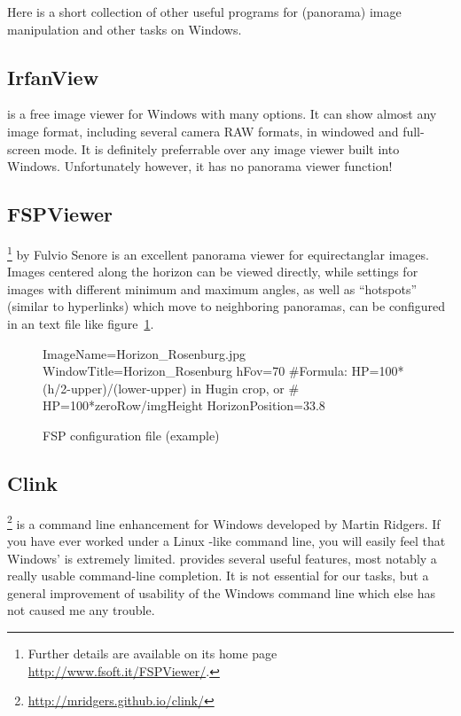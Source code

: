 Here is a short collection of other useful programs for (panorama)
image manipulation and other tasks on Windows.


\subsection{IrfanView}
\label{sec:landscapes:IrfanView}

 is a free image viewer for Windows with many
options. It can show almost any image format, including several camera
RAW formats, in windowed and full-screen mode. It is definitely
preferrable over any image viewer built into Windows. Unfortunately
however, it has no panorama viewer function!

\subsection{FSPViewer}
\label{sec:landscapes:FSPViewer}

\footnote{Further details are available on its home
  page \url{http://www.fsoft.it/FSPViewer/}.} by Fulvio
Senore is an excellent panorama viewer for equirectanglar
images. Images centered along the horizon can be viewed directly,
while settings for images with different minimum and maximum angles,
as well as ``hotspots'' (similar to hyperlinks) which move to
neighboring panoramas, can be configured in an  text file
like figure~\ref{fig:FSPexample}.


\begin{figure}[h]\centering
\begin{configfile}
ImageName=Horizon_Rosenburg.jpg
WindowTitle=Horizon_Rosenburg
hFov=70
#Formula: HP=100*(h/2-upper)/(lower-upper) in Hugin crop, or
#         HP=100*zeroRow/imgHeight
HorizonPosition=33.8
\end{configfile}
\caption{FSP configuration file (example)}
\label{fig:FSPexample}
\end{figure}

\subsection{Clink}
\label{sec:landscapes:clink}

\footnote{\url{http://mridgers.github.io/clink/}} is a command
line enhancement for Windows developed by Martin Ridgers. If you have
ever worked under a Linux -like command line, you will
easily feel that Windows'  is extremely limited. 
provides several useful features, most notably a really usable
command-line completion. It is not essential for our tasks, but a
general improvement of usability of the Windows command line which
else has not caused me any trouble.

